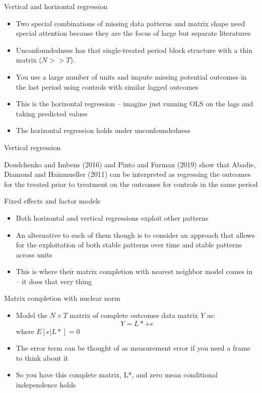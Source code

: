 \documentclass{beamer}
\begin{document}
\begin{frame}{Vertical and horizontal regression}

\begin{itemize}
\item Two special combinations of missing data patterns and matrix shape need special attention because they are the focus of large but separate literatures
\item Unconfoundedness has that single-treated period block structure with a thin matrix ($N>>T$). 
\item You use a large number of units and impute missing potential outcomes in the last period using controls with similar lagged outcomes
\item This is the horizontal regression -- imagine just running OLS on the lags and taking predicted values
\item The horizontal regression holds under unconfoundedness
\end{itemize}

\end{frame}

\begin{frame}{Vertical regression}

Doudchenko and Imbens (2016) and Pinto and Furman (2019) show that Abadie, Diamond and Hainmueller (2011) can be interpreted as regressing the outcomes for the treated prior to treatment on the outcomes for controls in the same period

\end{frame}

\begin{frame}{Fixed effects and factor models}

\begin{itemize}
\item Both horizontal and vertical regressions exploit other patterns
\item An alternative to each of them though is to consider an approach that allows for the exploitation of both stable patterns over time and stable patterns across units
\item This is where their matrix completion with nearest neighbor model comes in -- it does that very thing
\end{itemize}

\end{frame}

\begin{frame}{Matrix completion with nuclear norm}

\begin{itemize}
\item Model the $N \times T$ matrix of complete outcomes data matrix $Y$ as: $$Y = L* + e$$where $E[e|L*]=0$
\item The error term can be thought of as measurement error if you need a frame to think about it
\item So you have this complete matrix, L*, and zero mean conditional independence holds
\end{itemize}

\end{frame}
\end{document}
